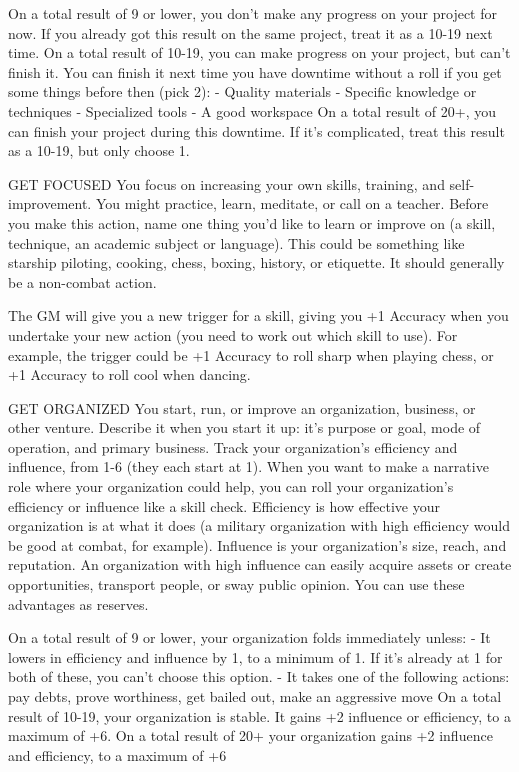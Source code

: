                                                                                                                   


On a total result of 9 or lower, you don’t make any progress on your project for now. If you already  
got this result on the same project, treat it as a 10-19 next time.  
On a total result of 10-19, you can make progress on your project, but can’t finish it. You can finish  
it next time you have downtime without a roll if you get some things before then (pick 2):  
    -    Quality materials  
    -    Specific knowledge or techniques  
    -    Specialized tools  
    -    A good workspace  
On a total result of 20+, you can finish your project during this downtime. If it’s complicated, treat  
this result as a 10-19, but only choose 1.  

GET FOCUSED  
You focus on increasing your own skills, training, and self-improvement. You might practice, learn,  
meditate, or call on a teacher. Before you make this action, name one thing you’d like to learn or  
improve on (a skill, technique, an academic subject or language). This could be something like  
starship piloting, cooking, chess, boxing, history, or etiquette. It should generally be a non-combat  
action.  

The GM will give you a new trigger for a skill, giving you +1 Accuracy when you undertake your  
new action (you need to work out which skill to use). For example, the trigger could be +1  
Accuracy to roll sharp when playing chess, or +1 Accuracy to roll cool when dancing.  

GET ORGANIZED  
You start, run, or improve an organization, business, or other venture. Describe it when you start it  
up: it’s purpose or goal, mode of operation, and primary business. Track your organization’s  
efficiency and influence, from 1-6 (they each start at 1). When you want to make a narrative role  
where your organization could help, you can roll your organization’s efficiency or influence like a  
skill check. Efficiency is how effective your organization is at what it does (a military organization  
with high efficiency would be good at combat, for example). Influence is your organization’s size,  
reach, and reputation. An organization with high influence can easily acquire assets or create  
opportunities, transport people, or sway public opinion. You can use these advantages as  
reserves.  

On a total result of 9 or lower, your organization folds immediately unless:  
    -    It lowers in efficiency and influence by 1, to a minimum of 1. If it’s already at 1 for both of  
         these, you can’t choose this option.  
    -    It takes one of the following actions: pay debts, prove worthiness, get bailed out, make an  
         aggressive move  
On a total result of 10-19, your organization is stable. It gains +2 influence or efficiency, to a  
maximum of +6.  
On a total result of 20+ your organization gains +2 influence and efficiency, to a maximum of +6  

